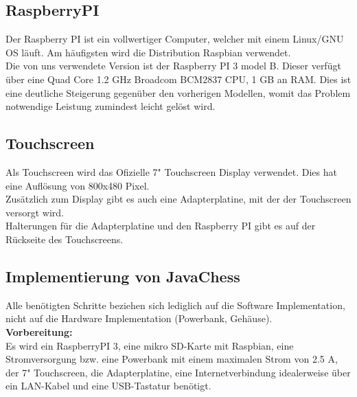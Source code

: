 \documentclass[12pt,a4paper]{article}
\begin{document}
{\subsection{RaspberryPI}

Der Raspberry PI ist ein vollwertiger Computer, welcher mit einem Linux/GNU OS läuft. Am häufigsten wird die Distribution Raspbian verwendet. \\
Die von uns verwendete Version ist der Raspberry PI 3 model B. Dieser verfügt über eine Quad Core 1.2 GHz Broadcom BCM2837 CPU, 1 GB an RAM. Dies ist eine deutliche Steigerung gegenüber den vorherigen Modellen, womit das Problem notwendige Leistung zumindest leicht gelöst wird. \\

\subsection{Touchscreen}

Als Touchscreen wird das Ofizielle 7" Touchscreen Display verwendet. Dies hat eine Auflösung von 800x480 Pixel. \\
Zusätzlich zum Display gibt es auch eine Adapterplatine, mit der der Touchscreen versorgt wird. \\
Halterungen für die Adapterplatine und den Raspberry PI gibt es auf der Rückseite des Touchscreens.

\subsection{Implementierung von JavaChess}

Alle benötigten Schritte beziehen sich lediglich auf die Software Implementation, nicht auf die Hardware Implementation (Powerbank, Gehäuse). \\[1ex]

\textbf{Vorbereitung:} \\[2ex]
Es wird ein RaspberryPI 3, eine mikro SD-Karte mit Raspbian, eine Stromversorgung bzw. eine Powerbank mit einem maximalen Strom von 2.5 A, der 7" Touchscreen, die Adapterplatine, eine Internetverbindung idealerweise über ein LAN-Kabel und eine USB-Tastatur benötigt. \\

}
\end{document}
